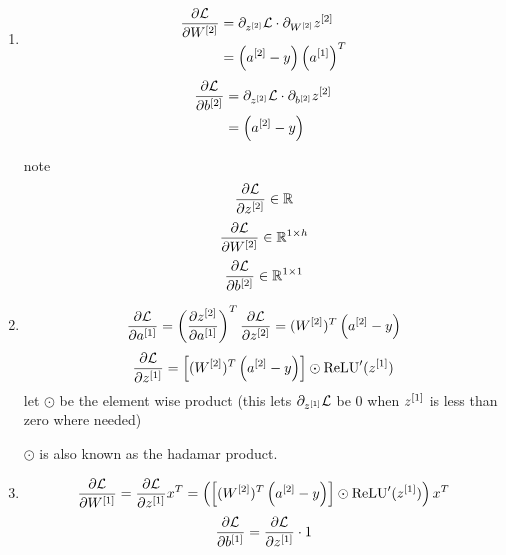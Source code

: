 \documentclass{report}
\begin{document}
\begin{enumerate}
\begin{enumerate}
\begin{equation}
\begin{split}
            &= a^{[2]} - y
        \end{split}
    \end{equation}
    \item \begin{equation}\begin{split}
            \frac{\partial \mathcal{L}  }{\partial W^{[2]}} &= \partial_{z^{[2]}} \mathcal{L} \cdot \partial_{W^{[2]}}{z^{[2]}} \\
            &= \left( a^{[2]}-y \right) \left( a^{[1]} \right)^T
    \end{split}
    \end{equation}
    \begin{equation}\begin{split}
            \frac{\partial \mathcal{L}  }{\partial b^{[2]}} &= \partial_{z^{[2]}} \mathcal{L} \cdot \partial_{b^{[2]}}{z^{[2]}} \\
            &= \left( a^{[2]}-y \right) 
    \end{split}
    \end{equation}

    note
    \[\frac{\partial \mathcal{L} }{\partial z^{[2]}} \in \mathbb R\]
    \[\frac{\partial \mathcal{L}}{\partial W^{[2]}}\in \mathbb R^{1\times h}\]
    \[\frac{\partial \mathcal{L}}{\partial b^{[2]}}\in \mathbb R^{1\times 1}\]

    \item \begin{equation}
        \frac{\partial \mathcal{L}}{\partial a^{[1]}} = \left(\frac{\partial z^{[2]}}{\partial a^{[1]}}\right)^T \frac{\partial \mathcal{L}}{\partial z^{[2]}} = (W^{[2]})^T \left(a^{[2]} - y\right)
    \end{equation}
    \begin{equation}
        \frac{\partial \mathcal{L}}{\partial z^{[1]}} = \left[(W^{[2]})^T \left(a^{[2]} - y\right)\right] \odot \text{ReLU}'(z^{[1]})
    \end{equation}
    let \(\odot\) be the element wise product (this lets \(\partial_{z^{[1]}}\mathcal{L}\) be 0 when \(z^{[1]}\) is less than zero where needed)

    \(\odot\) is also known as the hadamar product.

    \item 
    \begin{equation}
        \frac{\partial \mathcal{L}}{\partial W^{[1]}} = \frac{\partial \mathcal{L}}{\partial z^{[1]}} x^T= \left( \left[(W^{[2]})^T \left(a^{[2]} - y\right)\right] \odot \text{ReLU}'(z^{[1]}) \right) x^T
    \end{equation}
    \begin{equation}
        \frac{\partial \mathcal{L}}{\partial b^{[1]}} = \frac{\partial \mathcal{L}}{\partial z^{[1]}} \cdot 1
    \end{equation}
    \end{enumerate}



\end{enumerate}
\end{document}
